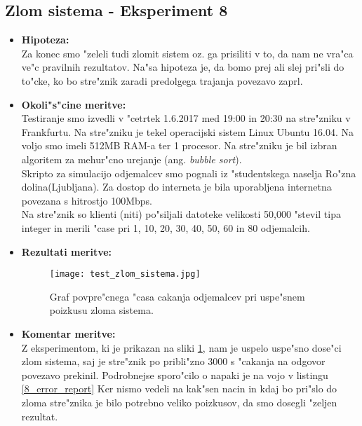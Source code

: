 \subsection{Zlom sistema - Eksperiment 8}
    \begin{itemize}
    	\item \textbf{Hipoteza: }  \\
    		Za konec smo "zeleli tudi zlomit sistem oz. ga prisiliti v to, da nam ne vra"ca ve"c pravilnih rezultatov. Na"sa hipoteza je, da bomo prej ali slej pri"sli do to"cke, ko bo stre"znik zaradi predolgega trajanja povezavo zaprl.

    	\item \textbf{Okoli"s"cine meritve: } \\
    			Testiranje smo izvedli v "cetrtek 1.6.2017 med 19:00 in 20:30 na stre"zniku v Frankfurtu. Na stre"zniku je tekel operacijski sistem Linux Ubuntu 16.04. Na voljo smo imeli 512MB RAM-a ter 1 procesor. Na stre"zniku je bil izbran algoritem za mehur"cno urejanje (ang. \textit{bubble sort}).\\ Skripto za simulacijo odjemalcev smo pognali iz "studentskega naselja Ro"zna dolina(Ljubljana). Za dostop do interneta je bila uporabljena internetna povezana s hitrostjo 100Mbps.\\ Na stre"znik so klienti (niti) po"siljali datoteke velikosti 50,000  "stevil tipa integer in merili "case pri 1, 10, 20, 30, 40, 50, 60 in 80 odjemalcih.

     	\item \textbf{Rezultati meritve: }  \\
    		\begin{figure}[h!]
  		\centering
  		  \texttt{[image: test\_zlom\_sistema.jpg]}
  		\caption{Graf povpre"cnega "casa cakanja odjemalcev pri uspe"snem poizkusu zloma sistema. }
  		\label{8_graf_zlom_sistema}
		\end{figure}
    		 \newpage
    	\item \textbf{Komentar meritve: } \\
    		Z eksperimentom, ki je prikazan na sliki \ref{8_graf_zlom_sistema}, nam je uspelo uspe"sno dose"ci zlom sistema, saj je stre"znik po pribli"zno 3000 s "cakanja na odgovor povezavo prekinil. Podrobnejse sporo"cilo o napaki je na vojo v listingu \ref{8_error_report}
		Ker nismo vedeli na kak"sen nacin in kdaj bo pri"slo do zloma stre"znika je bilo potrebno veliko poizkusov, da smo dosegli "zeljen rezultat.


\end{itemize}
